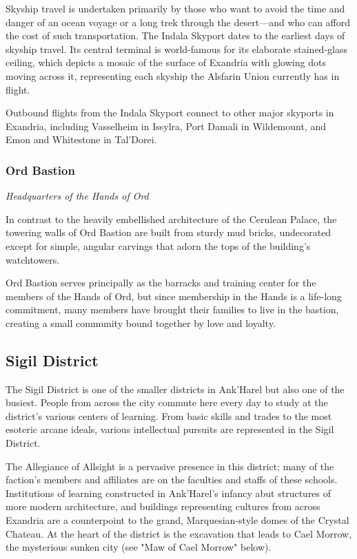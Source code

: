 \documentclass[10pt,a4paper,twoside,bg=print,twocolumn,openany,nodeprecatedcode]{dndbook}
\begin{document}
Skyship travel is undertaken primarily by those who want to avoid the time and danger of an ocean voyage or a long trek through the desert—and who can afford the cost of such transportation. The Indala Skyport dates to the earliest days of skyship travel. Its central terminal is world-famous for its elaborate stained-glass ceiling, which depicts a mosaic of the surface of Exandria with glowing dots moving across it, representing each skyship the Alsfarin Union currently has in flight.

Outbound flights from the Indala Skyport connect to other major skyports in Exandria, including Vasselheim in Issylra, Port Damali in Wildemount, and Emon and Whitestone in Tal'Dorei.

\subsubsection{Ord Bastion}
\textit{Headquarters of the Hands of Ord}

In contrast to the heavily embellished architecture of the Cerulean Palace, the towering walls of Ord Bastion are built from sturdy mud bricks, undecorated except for simple, angular carvings that adorn the tops of the building's watchtowers.

Ord Bastion serves principally as the barracks and training center for the members of the Hands of Ord, but since membership in the Hands is a life-long commitment, many members have brought their families to live in the bastion, creating a small community bound together by love and loyalty.

\subsection{Sigil District}
The Sigil District is one of the smaller districts in Ank'Harel but also one of the busiest. People from across the city commute here every day to study at the district's various centers of learning. From basic skills and trades to the most esoteric arcane ideals, various intellectual pursuits are represented in the Sigil District.

The Allegiance of Allsight is a pervasive presence in this district; many of the faction's members and affiliates are on the faculties and staffs of these schools. Institutions of learning constructed in Ank'Harel's infancy abut structures of more modern architecture, and buildings representing cultures from across Exandria are a counterpoint to the grand, Marquesian-style domes of the Crystal Chateau. At the heart of the district is the excavation that leads to Cael Morrow, the mysterious sunken city (see "Maw of Cael Morrow" below).
\end{document}
